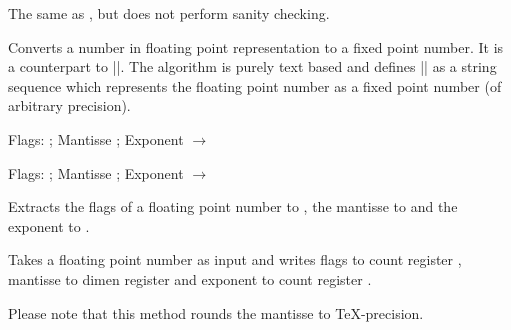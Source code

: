 \begin{command}{\pgfmathfloatqparsenumber{}}
	The same as \pgfmathfloatparsenumber, but does not perform sanity checking.
\end{command}

\begin{command}{}
	Converts a number in floating point representation to a fixed point number. It is a counterpart to |\pgfmathfloatparsenumber|. The algorithm is purely text based and defines |\pgfmathresult| as a string sequence which represents the floating point number  as a fixed point number (of arbitrary precision).

\begin{codeexample}[]
\pgfmathfloattomacro{\pgfmathresult}{\F}{\M}{\E}
Flags: \F; Mantisse \M; Exponent \E
$\to$ 
\pgfmathfloattofixed{\pgfmathresult}
\pgfmathresult
\end{codeexample}

\begin{codeexample}[]
\pgfmathfloattomacro{\pgfmathresult}{\F}{\M}{\E}
Flags: \F; Mantisse \M; Exponent \E
$\to$
\pgfmathfloattofixed{\pgfmathresult}
\pgfmathresult 
\end{codeexample}
\end{command}


\begin{command}{}
	Extracts the flags of a floating point number  to , the mantisse to  and the exponent to .
\end{command}

\begin{command}{}
	Takes a floating point number  as input and writes flags to count
	register , mantisse to dimen register  and exponent to count
	register .

	Please note that this method rounds the mantisse to \TeX-precision.
\end{command}

